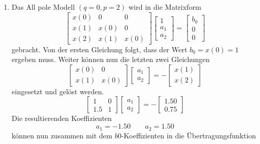 \begin{beispiel}
\begin{enumerate}
\item Das All pole Modell $(q=0,p=2)$ wird in die Matrixform
\begin{equation}\left[\begin{array}{ccc}
x(0) & 0 & 0 \\
x(1) & x(0) & 0 \\
x(2) & x(1) & x(0)
\end{array}\right]\left[\begin{array}{c}
1 \\
a_1 \\
a_2
\end{array}\right]=\left[\begin{array}{c}
b_0 \\
0 \\
0
\end{array}\right]\end{equation}
gebracht. 
Von der ersten Gleichung folgt, dass der Wert $b_0 = x(0)=1$ ergeben muss. 
Weiter können nun die letzten zwei Gleichungen
\begin{equation}\left[\begin{array}{ll}
x(0) & 0 \\
x(1) & x(0)
\end{array}\right]\left[\begin{array}{l}
a_1 \\
a_2
\end{array}\right]=-\left[\begin{array}{l}
x(1) \\
x(2)
\end{array}\right]\end{equation}
eingesetzt und gelöst werden.
\begin{equation}\left[\begin{array}{cc}
1 & 0 \\
1.5 & 1
\end{array}\right]\left[\begin{array}{l}
a_1 \\
a_2
\end{array}\right]=-\left[\begin{array}{c}
1.50 \\
0.75
\end{array}\right]\end{equation}
Die resultierenden Koeffizienten
\begin{equation}
a_1=-1.50 \quad  \quad a_2=1.50
\end{equation}
können nun zusammen mit dem $b0$-Koeffizienten in die Übertragungsfunktion  

\end{enumerate}
\end{beispiel}
